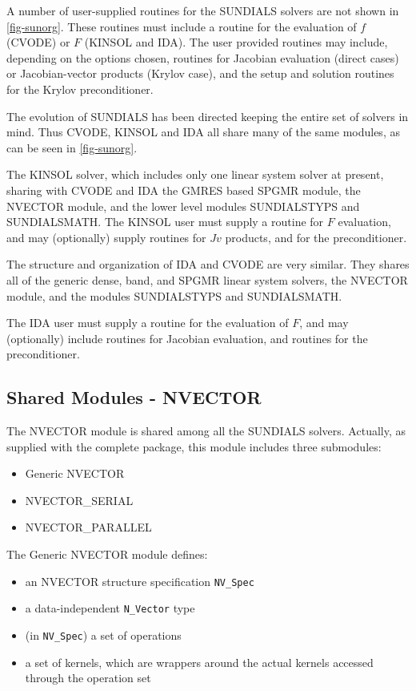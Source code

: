 A number of user-supplied routines for the SUNDIALS solvers are not shown in
\ref{fig-sunorg}.  These routines must include a routine for the evaluation
of $f$ (CVODE) or $F$ (KINSOL and IDA). The user provided routines may
include, depending on the options chosen, routines for Jacobian evaluation
(direct cases) or Jacobian-vector products (Krylov case), and the setup and
solution routines for the Krylov preconditioner.

The evolution of SUNDIALS has been directed keeping the entire set of
solvers in mind.  Thus CVODE, KINSOL and IDA all share many of the same
modules, as can be seen in \ref{fig-sunorg}.

The KINSOL solver, which includes only one linear system solver at present,
sharing with CVODE and IDA the GMRES based SPGMR module, the NVECTOR module,
and the lower level modules SUNDIALSTYPS and SUNDIALSMATH. The KINSOL user
must supply a routine for $F$ evaluation, and may (optionally) supply
routines for $Jv$ products, and for the preconditioner.

The structure and organization of IDA and CVODE are very similar. They
shares all of the generic dense, band, and SPGMR linear system solvers, the
NVECTOR module, and the modules SUNDIALSTYPS and SUNDIALSMATH.

The IDA user must supply a routine for the evaluation of $F$, and may
(optionally) include routines for Jacobian evaluation, and routines
for the preconditioner.

\subsection{Shared Modules - NVECTOR}

The NVECTOR module is shared among all the SUNDIALS solvers.
Actually, as supplied with the complete package, this module
includes three submodules:
\begin{itemize}
\item Generic NVECTOR
\item NVECTOR\_SERIAL
\item NVECTOR\_PARALLEL
\end{itemize}

The Generic NVECTOR module defines:
\begin{itemize}
\item an NVECTOR  structure specification {\tt NV\_Spec}
\item a data-independent {\tt N\_Vector} type
\item (in {\tt NV\_Spec}) a set of operations
\item a set of kernels, which are wrappers around the actual kernels
accessed through the operation set
\end{itemize}

